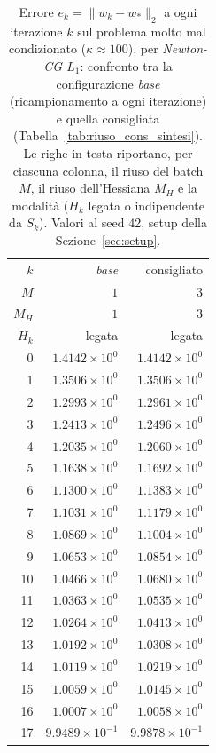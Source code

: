 \begin{table}[H]
\centering
\footnotesize
\renewcommand{\arraystretch}{0.85}
\setlength{\tabcolsep}{8pt}
\caption{Errore $e_k=\|w_k-w_*\|_2$ a ogni iterazione $k$ sul problema molto mal condizionato ($\kappa\approx 100$), per \emph{Newton-CG $L_1$}: confronto tra la configurazione \emph{base} (ricampionamento a ogni iterazione) e quella consigliata (Tabella~\ref{tab:riuso_cons_sintesi}). Le righe in testa riportano, per ciascuna colonna, il riuso del batch $M$, il riuso dell'Hessiana $M_H$ e la modalità ($H_k$ legata o indipendente da $S_k$). Valori al seed 42, setup della Sezione~\ref{sec:setup}.}
\label{tab:riuso_cons_veryill_nl1}
\begin{tabular}{@{}rrr@{}}
\toprule
$k$ & \emph{base} & consigliato\\
$M$ & $1$ & $3$\\
$M_H$ & $1$ & $3$\\
$H_k$ & legata & legata\\
\midrule
0 & $1.4142\times10^{0}$ & $1.4142\times10^{0}$\\
1 & $1.3506\times10^{0}$ & $1.3506\times10^{0}$\\
2 & $1.2993\times10^{0}$ & $1.2961\times10^{0}$\\
3 & $1.2413\times10^{0}$ & $1.2496\times10^{0}$\\
4 & $1.2035\times10^{0}$ & $1.2060\times10^{0}$\\
5 & $1.1638\times10^{0}$ & $1.1692\times10^{0}$\\
6 & $1.1300\times10^{0}$ & $1.1383\times10^{0}$\\
7 & $1.1031\times10^{0}$ & $1.1179\times10^{0}$\\
8 & $1.0869\times10^{0}$ & $1.1004\times10^{0}$\\
9 & $1.0653\times10^{0}$ & $1.0854\times10^{0}$\\
10 & $1.0466\times10^{0}$ & $1.0680\times10^{0}$\\
11 & $1.0363\times10^{0}$ & $1.0535\times10^{0}$\\
12 & $1.0264\times10^{0}$ & $1.0413\times10^{0}$\\
13 & $1.0192\times10^{0}$ & $1.0308\times10^{0}$\\
14 & $1.0119\times10^{0}$ & $1.0219\times10^{0}$\\
15 & $1.0059\times10^{0}$ & $1.0145\times10^{0}$\\
16 & $1.0007\times10^{0}$ & $1.0058\times10^{0}$\\
17 & $9.9489\times10^{-1}$ & $9.9878\times10^{-1}$\\

\end{tabular}
\end{table}
